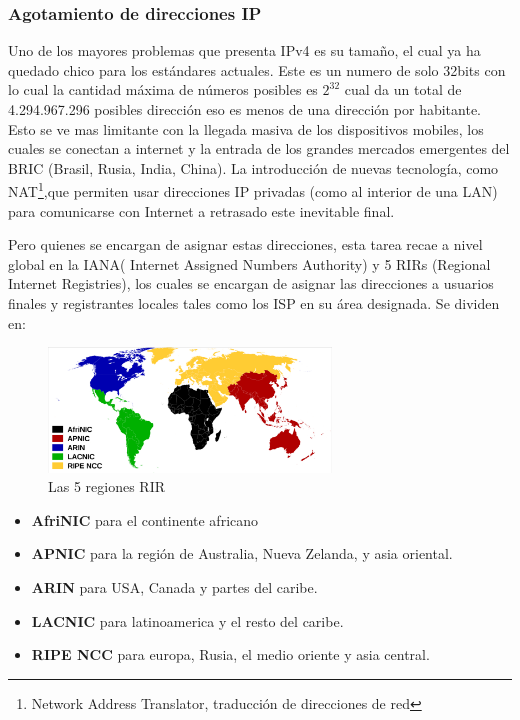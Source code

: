 \documentclass[11pt,a4paper]{article}
\begin{document}
\subsubsection{Agotamiento de direcciones IP}
Uno de los mayores problemas que presenta IPv4 es su tamaño, el cual ya ha quedado chico para los
estándares actuales. Este es un numero de solo 32bits con lo cual la cantidad máxima de números
posibles es $2^{32}$ cual da un total de 4.294.967.296 posibles dirección eso es menos de una
dirección por habitante. Esto se ve mas limitante con la llegada masiva de los dispositivos mobiles, 
los cuales se conectan a internet y la entrada de los grandes mercados emergentes del BRIC (Brasil, 
Rusia, India, China).
La introducción de nuevas tecnología, como NAT\footnote{Network Address Translator, traducción de 
direcciones de red},que permiten usar direcciones IP privadas (como al interior de una LAN) para 
comunicarse con Internet a retrasado este inevitable final.\par
Pero quienes se encargan de asignar estas direcciones, esta tarea recae a nivel global en la IANA( 
Internet Assigned Numbers Authority) y 5 RIRs (Regional Internet Registries), los cuales se encargan 
de asignar las direcciones a usuarios finales y registrantes locales tales como los ISP en su área 
designada. Se dividen en:
\begin{figure}[h]
\centering
  \includegraphics[width=0.67\textwidth]{RIR.png}
 \caption[Las 5 regiones RIR]{Las 5 regiones RIR}
\end{figure}
\begin{itemize}
\item \textbf{AfriNIC} para el continente africano
\item \textbf{APNIC} para la región de Australia, Nueva Zelanda, y asia oriental.
\item \textbf{ARIN} para USA, Canada y partes del caribe.
\item \textbf{LACNIC} para latinoamerica y el resto del caribe.
\item \textbf{RIPE NCC} para europa, Rusia, el medio oriente y asia central.
\end{itemize}\vspace{.2cm}
\end{document}
